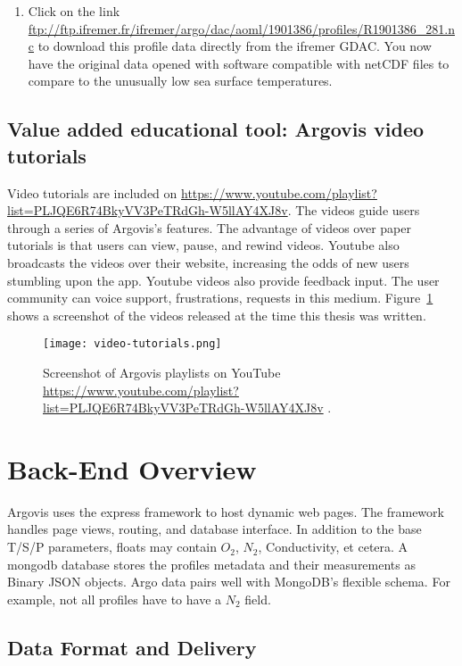 \begin{enumerate}
\item Click on the link \url{ftp://ftp.ifremer.fr/ifremer/argo/dac/aoml/1901386/profiles/R1901386_281.nc} to download this profile data directly from the ifremer GDAC. You now have the original data opened with software compatible with netCDF files to compare to the unusually low sea surface temperatures. 

\end{enumerate}

\subsection{Value added educational tool: Argovis video tutorials}

Video tutorials are included on \url{https://www.youtube.com/playlist?list=PLJQE6R74BkyVV3PeTRdGh-W5llAY4XJ8v}. The videos guide users through a series of Argovis's features. The advantage of videos over paper tutorials is that users can view, pause, and rewind videos. Youtube also broadcasts the videos over their website, increasing the odds of new users stumbling upon the app. Youtube videos also provide feedback input. The user community can voice support, frustrations, requests in this medium.  Figure~\ref{fig:yt-vids} shows a screenshot of the videos released at the time this thesis was written.

\begin{figure}[H]
\begin{minipage}{6in}
\centering
\texttt{[image: video-tutorials.png]}
\caption{\label{fig:yt-vids} Screenshot of Argovis playlists on YouTube \url{https://www.youtube.com/playlist?list=PLJQE6R74BkyVV3PeTRdGh-W5llAY4XJ8v} . }
\end{minipage}
\end{figure}

\section{Back-End Overview}
Argovis uses the \gls{express} framework to host dynamic web pages. The framework handles page views, routing, and database interface. In addition to the base T/S/P parameters, floats may contain $O_2$, $N_2$, Conductivity, et cetera. A \gls{mongodb} database stores the profiles metadata and their measurements as Binary JSON objects. Argo data pairs well with MongoDB's flexible schema. For example, not all profiles have to have a $N_2$ field.

\subsection{Data Format and Delivery}

